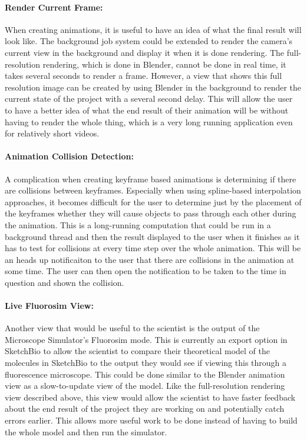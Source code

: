 \documentclass{article} %
\begin{document}
\paragraph{Render Current Frame:}When creating animations, it is useful to have an idea of what the final result will look like.  The background job system could be extended to render the camera's current view in the background and display it when it is done rendering.  The full-resolution rendering, which is done in Blender, cannot be done in real time, it takes several seconds to render a frame.  However, a view that shows this full resolution image can be created by using Blender in the background to render the current state of the project with a several second delay.  This will allow the user to have a better idea of what the end result of their animation will be without having to render the whole thing, which is a very long running application even for relatively short videos.

\paragraph{Animation Collision Detection:}A complication when creating keyframe based animations is determining if there are collisions between keyframes.  Especially when using spline-based interpolation approaches, it becomes difficult for the user to determine just by the placement of the keyframes whether they will cause objects to pass through each other during the animation.  This is a long-running computation that could be run in a background thread and then the result displayed to the user when it finishes as it has to test for collisions at every time step over the whole animation.  This will be an heads up notificaiton to the user that there are collisions in the animation at some time.  The user can then open the notification to be taken to the time in question and shown the collision.


\paragraph{Live Fluorosim View:}
Another view that would be useful to the scientist is the output of the Microscope Simulator's Fluorosim mode.  This is currently an export option in SketchBio to allow the scientist to compare their theoretical model of the molecules in SketchBio to the output they would see if viewing this through a fluorescence microscope.  This could be done similar to the Blender animation view as a slow-to-update view of the model.  Like the full-resolution rendering view described above, this view would allow the scientist to have faster feedback about the end result of the project they are working on and potentially catch errors earlier.  This allows more useful work to be done instead of having to build the whole model and then run the simulator.
\end{document}
